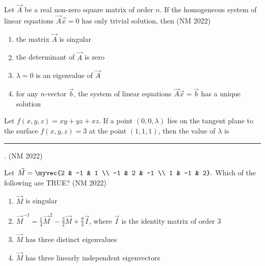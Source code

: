 \item  Let $\vec{A}$ be a real non-zero square matrix of order $n$. If the homogeneous system of linear equations $\vec{A} \vec{x} = 0$ has only trivial solution, then
\hfill(NM 2022)
\begin{enumerate}
    \item the matrix $\vec{A}$ is singular
    \item the determinant of $\vec{A}$ is zero
    \item $\lambda = 0$ is an eigenvalue of $\vec{A}$
    \item for any $n$-vector $\vec{b}$, the system of linear equations $\vec{A} \vec{x} = \vec{b}$ has a unique solution
\end{enumerate}
\item  Let $ f(x, y, z) = xy + yz + xz . $ If a point $ (0, 0, \lambda) $ lies on the tangent plane to the surface  
$f(x, y, z) = 3$
at the point $ (1, 1, 1) $, then the value of $ \lambda $ is \rule{1cm}{0.01pt}.
\hfill(NM 2022)
\item  Let  
$\vec{M}=
\myvec
{2 & -1 & 1 \\
-1 & 2 & -1 \\
1 & -1 & 2}.
$
Which of the following are TRUE?
\hfill(NM 2022)
\begin{enumerate}
    \item $\vec{M}$ is singular
    \item $\vec{M}^{-1} = {\frac{1}{4}}\vec{M}^{2} - {\frac{3}{2}}\vec{M} + {\frac{9}{4}}\vec{I} $, where $\vec{I}$ is the identity matrix of order 3
    \item $\vec{M}$ has three distinct eigenvalues
    \item $\vec{M}$ has three linearly independent eigenvectors
\end{enumerate}
